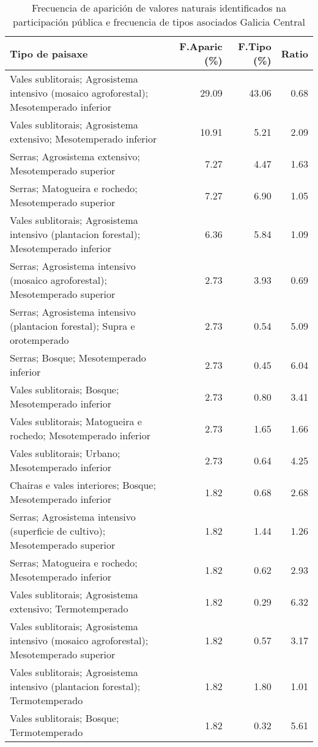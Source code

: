\begin{table}[p]
\centering
\caption{Frecuencia de aparición de valores naturais identificados na participación pública e frecuencia de tipos asociados Galicia Central} 
\label{vsixotnat7}
\begin{tabular}{lrrr}
  \hline
Tipo de paisaxe & F.Aparic (\%) & F.Tipo (\%) & Ratio \\ 
  \hline
Vales sublitorais; Agrosistema intensivo (mosaico agroforestal); Mesotemperado inferior & 29.09 & 43.06 & 0.68 \\ 
  Vales sublitorais; Agrosistema extensivo; Mesotemperado inferior & 10.91 & 5.21 & 2.09 \\ 
  Serras; Agrosistema extensivo; Mesotemperado superior & 7.27 & 4.47 & 1.63 \\ 
  Serras; Matogueira e rochedo; Mesotemperado superior & 7.27 & 6.90 & 1.05 \\ 
  Vales sublitorais; Agrosistema intensivo (plantacion forestal); Mesotemperado inferior & 6.36 & 5.84 & 1.09 \\ 
  Serras; Agrosistema intensivo (mosaico agroforestal); Mesotemperado superior & 2.73 & 3.93 & 0.69 \\ 
  Serras; Agrosistema intensivo (plantacion forestal); Supra e orotemperado & 2.73 & 0.54 & 5.09 \\ 
  Serras; Bosque; Mesotemperado inferior & 2.73 & 0.45 & 6.04 \\ 
  Vales sublitorais; Bosque; Mesotemperado inferior & 2.73 & 0.80 & 3.41 \\ 
  Vales sublitorais; Matogueira e rochedo; Mesotemperado inferior & 2.73 & 1.65 & 1.66 \\ 
  Vales sublitorais; Urbano; Mesotemperado inferior & 2.73 & 0.64 & 4.25 \\ 
  Chairas e vales interiores; Bosque; Mesotemperado inferior & 1.82 & 0.68 & 2.68 \\ 
  Serras; Agrosistema intensivo (superficie de cultivo); Mesotemperado superior & 1.82 & 1.44 & 1.26 \\ 
  Serras; Matogueira e rochedo; Mesotemperado inferior & 1.82 & 0.62 & 2.93 \\ 
  Vales sublitorais; Agrosistema extensivo; Termotemperado & 1.82 & 0.29 & 6.32 \\ 
  Vales sublitorais; Agrosistema intensivo (mosaico agroforestal); Mesotemperado superior & 1.82 & 0.57 & 3.17 \\ 
  Vales sublitorais; Agrosistema intensivo (plantacion forestal); Termotemperado & 1.82 & 1.80 & 1.01 \\ 
  Vales sublitorais; Bosque; Termotemperado & 1.82 & 0.32 & 5.61 \\ 
   \hline
\end{tabular}
\end{table}
